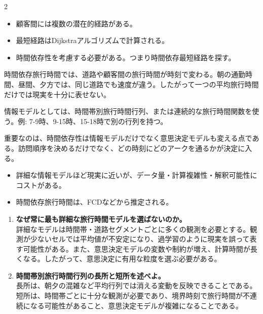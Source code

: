 \clearpage
{}
\begin{multicols}{2}\footnotesize\raggedcolumns
{}
\begin{itemize}
\item 顧客間には複数の潜在的経路がある。
\item 最短経路はDijkstraアルゴリズムで計算される。
\item 時間依存性を考慮する必要がある。つまり時間依存最短経路を探す。
\end{itemize}
時間依存旅行時間では、道路や顧客間の旅行時間が時刻で変わる。朝の通勤時間、昼間、夕方では、同じ道路でも速度が違う。したがって一つの平均旅行時間だけでは現実を十分に表せない。\par

情報モデルとしては、時間帯別旅行時間行列、または連続的な旅行時間関数を使う。例: 7-9時、9-15時、15-18時で別の行列を持つ。\par

重要なのは、時間依存性は情報モデルだけでなく意思決定モデルも変える点である。訪問順序を決めるだけでなく、どの時刻にどのアークを通るかが決定に入る。\par
{}
\begin{itemize}
\item 詳細な情報モデルほど現実に近いが、データ量・計算複雑性・解釈可能性にコストがある。
\item 時間依存旅行時間は、FCDなどから推定される。
\end{itemize}
\begin{enumerate}
\item \textbf{なぜ常に最も詳細な旅行時間モデルを選ばないのか。}\\詳細なモデルは時間帯・道路セグメントごとに多くの観測を必要とする。観測が少ないセルでは平均値が不安定になり、過学習のように現実を誤って表す可能性がある。また、意思決定モデルの変数や制約が増え、計算時間が長くなる。したがって、意思決定に有用な粒度を選ぶ必要がある。
\item \textbf{時間帯別旅行時間行列の長所と短所を述べよ。}\\長所は、朝夕の混雑など平均行列では消える変動を反映できることである。短所は、時間帯ごとに十分な観測が必要であり、境界時刻で旅行時間が不連続になる可能性があること、意思決定モデルが複雑になることである。
\end{enumerate}
\end{multicols}

